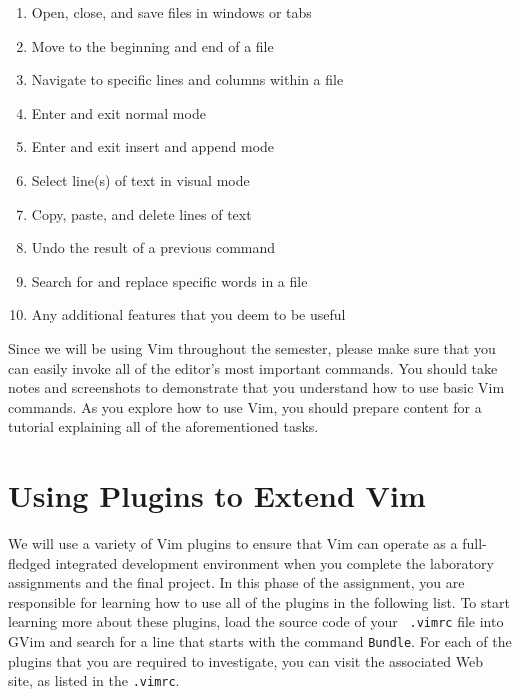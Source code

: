 \begin{enumerate}

	\item Open, close, and save files in windows or tabs

	\item Move to the beginning and end of a file

	\item Navigate to specific lines and columns within a file

	\item Enter and exit normal mode

	\item Enter and exit insert and append mode

	\item Select line(s) of text in visual mode

	\item Copy, paste, and delete lines of text

	\item Undo the result of a previous command

	\item Search for and replace specific words in a file

	\item Any additional features that you deem to be useful

\end{enumerate}

Since we will be using Vim throughout the semester, please make sure that you can easily invoke all of the editor's most
important commands.  You should take notes and screenshots to demonstrate that you understand how to use basic
Vim commands. As you explore how to use Vim, you should prepare content for a tutorial explaining all of the
aforementioned tasks.

\section*{Using Plugins to Extend Vim}

We will use a variety of Vim plugins to ensure that Vim can operate as a full-fledged integrated development environment when you
complete the laboratory assignments and the final project.  In this phase of the assignment, you are responsible for learning how
to use all of the plugins in the following list.  To start learning more about these plugins, load the source code of your {\tt
  .vimrc} file into GVim and search for a line that starts with the command {\tt Bundle}.  For each of the plugins that you
are required to investigate, you can visit the associated Web site, as listed in the {\tt .vimrc}.

